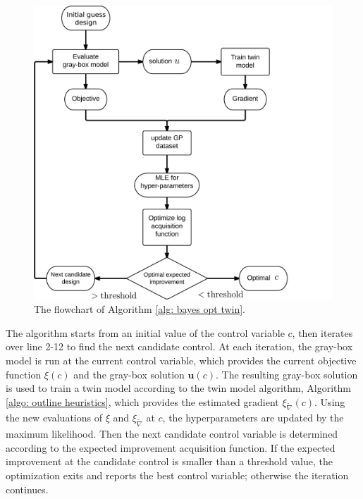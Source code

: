 \begin{figure}
    \begin{center}
        \includegraphics[width=12cm]{../opt_framework_2.png}
        \caption{The flowchart of Algorithm \ref{alg: bayes opt twin}.}
        \label{fig: opt flowchart}
    \end{center}
\end{figure}

The algorithm starts from an initial value of the control variable $c$, then
iterates over line 2-12 to find the next candidate control.
At each iteration, the gray-box model is run at the current control variable, which 
provides the current objective function $\xi(c)$ and the gray-box solution
$\boldsymbol{u}(c)$.
The resulting gray-box solution is used to train a twin model according to the
twin model algorithm, Algorithm 
\ref{algo: outline heuristics}, which provides the estimated gradient $\xi_{\tilde{\nabla}}(c)$.
Using the new evaluations of $\xi$ and $\xi_{\tilde{\nabla}}$ at $c$, the hyperparameters are
updated by the maximum likelihood. Then the next candidate control variable is determined
according to the expected improvement acquisition function. If the expected improvement at
the candidate control is smaller than a threshold value, the optimization exits and reports 
the best control variable; otherwise the iteration continues.\\


